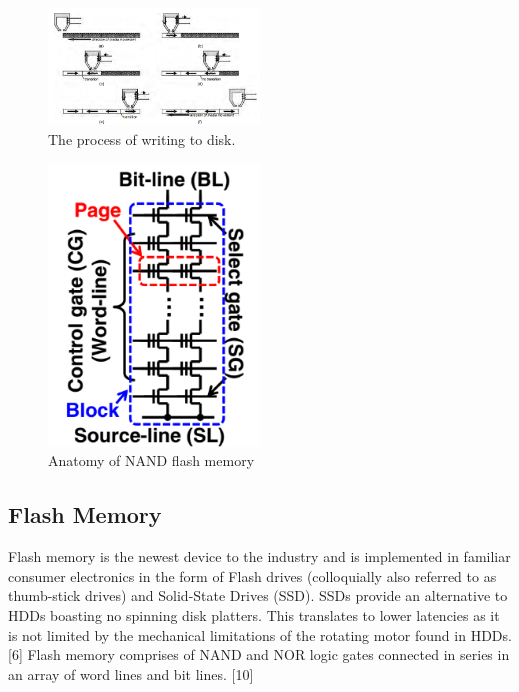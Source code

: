 \documentclass[letterpaper, 10 pt, conference]{ieeeconf}
\begin{document}
\begin{figure}[H] %
	\centering
	\includegraphics [width=0.5\textwidth] {Figures/Writing to Disk.png} 
    \caption{The process of writing to disk. \cite{5}}
\end{figure}

\begin{figure}[!h] %
	\centering
	\includegraphics [width=0.5\textwidth] {Figures/NAND Flash Memory.png} 
    \caption{Anatomy of NAND flash memory \cite{10}}
\end{figure}  

\subsection{Flash Memory}
Flash memory is the newest device to the industry and is implemented in familiar consumer electronics in the form of Flash drives (colloquially also referred to as thumb-stick drives) and Solid-State Drives (SSD).  SSDs provide an alternative to HDDs boasting no spinning disk platters.  This translates to lower latencies as it is not limited by the mechanical limitations of the rotating motor found in HDDs. [6]  Flash memory comprises of NAND and NOR logic gates connected in series in an array of word lines and bit lines. [10]
\end{document}
